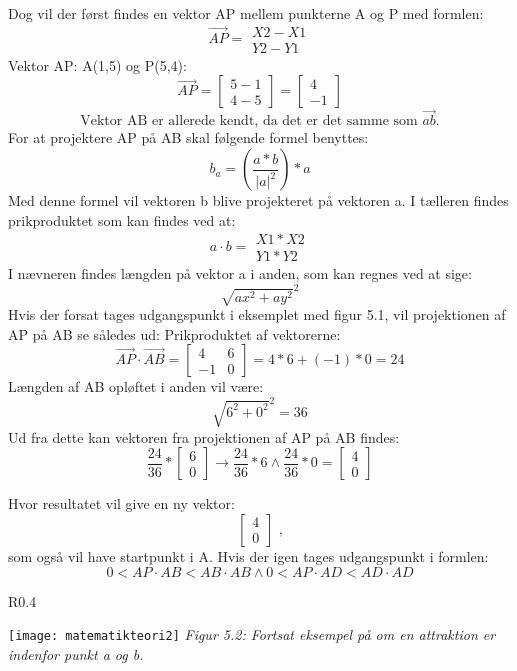 Dog vil der først findes en vektor AP mellem punkterne A og P med formlen: \[ \overrightarrow{AP} = \begin{matrix}X2-X1 \\ Y2-Y1\end{matrix} \]
Vektor AP: A(1,5) og P(5,4): \[ \overrightarrow{AP} = \begin{bmatrix}5-1 \\ 4-5\end{bmatrix} = \begin{bmatrix} 4 \\ -1 \end{bmatrix} \]
\[ \text{Vektor AB er allerede kendt, da det er det samme som } \overrightarrow{ab} \text{.} \]
For at projektere AP på AB skal følgende formel benyttes: \citep{ProjektionAfVektor} \[ b_{a} = (\frac{a*b}{|a|^2}) * a \]
Med denne formel vil vektoren b blive projekteret på vektoren a. I tælleren findes prikproduktet som kan findes ved at: \[ a \cdot b = \begin{matrix}X1 * X2 \\ Y1 * Y2\end{matrix}  \]
I nævneren findes længden på vektor a i anden, som kan regnes ved at sige: \[ \sqrt{ax^2+ay^2}^2 \]
Hvis der forsat tages udgangspunkt i eksemplet med figur 5.1, vil projektionen af AP på AB se således ud:
Prikproduktet af vektorerne: \[ \overrightarrow{AP} \cdot \overrightarrow{AB} = \begin{bmatrix} 4 & 6 \\ -1 & 0 \end{bmatrix} = 4*6+(-1)*0 = 24 \]
Længden af AB opløftet i anden vil være: \[ \sqrt{6^2+0^2}^2 = 36 \]
Ud fra dette kan vektoren fra projektionen af AP på AB findes: 
\[ \frac{24}{36} * \begin{bmatrix} 6 \\ 0 \end{bmatrix} \rightarrow \frac{24}{36} * 6 \wedge \frac{24}{36} * 0 = \begin{bmatrix} 4 \\ 0 \end{bmatrix} \]

Hvor resultatet vil give en ny vektor: \[ \begin{bmatrix} 4 \\ 0 \end{bmatrix} \text{ ,} \]  som også vil have startpunkt i A. Hvis der igen tages udgangspunkt i formlen:
\[0 < AP \cdot AB < AB \cdot AB \wedge 0 < AP \cdot AD < AD \cdot AD \]
\begin{wrapfigure}{R}{0.4\textwidth}
  \vspace{-20pt}
  \begin{center}
    \texttt{[image: matematikteori2]} \newline
    \textit{Figur 5.2: Fortsat eksempel på om en attraktion er indenfor punkt a og b.}\newline
  \end{center}
  \vspace{-20pt}
\end{wrapfigure}

